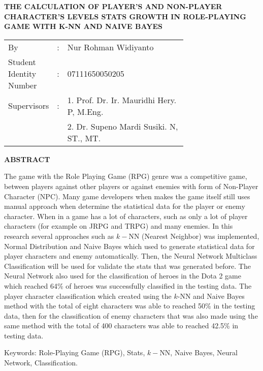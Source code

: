 \begin{spacing}{1}
	\begin{center}
		\large\textbf{THE CALCULATION OF PLAYER'S AND NON-PLAYER CHARACTER'S LEVELS STATS GROWTH IN ROLE-PLAYING GAME WITH K-NN AND NAIVE BAYES}
	\end{center}
	\vspace{2ex}
	
	\begin{adjustwidth}{-0.2cm}{}
		\begin{tabular}{lcp{0.7\linewidth}}
			By &:& Nur Rohman Widiyanto \\
			Student Identity Number &:&	07111650050205 \\
			Supervisors &:& 1. Prof. Dr. Ir. Mauridhi Hery. P, M.Eng. \\
			& & 2. Dr. Supeno Mardi Susiki. N, ST., MT. \\
		\end{tabular}
	\end{adjustwidth}
	\vspace{2ex}
	
	\begin{center}
		\large\textbf{ABSTRACT}
	\end{center}
	\vspace{1ex}
	
	The game with the Role Playing Game (RPG) genre was a competitive game, between players against other players or against enemies with form of Non-Player Character (NPC). Many game developers when makes the game itself still uses manual approach when determine the statistical data for the player or enemy character. When in a game has a lot of characters, such as only a lot of player characters (for example on JRPG and TRPG) and many enemies. In this research several approaches such as $k-$NN (Nearest Neighbor) was implemented, Normal Distribution and Naive Bayes which used to generate statistical data for player characters and enemy automatically. Then, the Neural Network Multiclass Classification will be used for validate the stats that was generated before. The Neural Network also used for the classification of heroes in the Dota 2 game which reached 64\% of heroes was successfully classified in the testing data. The player character classification which created using the $k$-NN and Naive Bayes method with the total of eight characters was able to reached 50\% in the testing data, then for the classification of enemy characters that was also made using the same method with the total of 400 characters was able to reached 42.5\% in testing data.
	\vspace{2ex}

	Keywords: Role-Playing Game (RPG), Stats, $k-$NN, Naive Bayes, Neural Network, Classification.
\end{spacing}